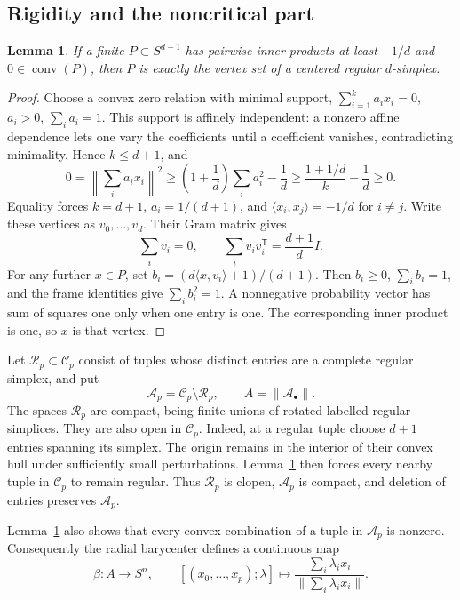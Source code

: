 \documentclass[11pt,a4paper]{article}
\newtheorem{lemma}[theorem]{Lemma}
\theoremstyle{definition}
\DeclareMathOperator{\conv}{conv}
\newcommand{\fat}[1]{\lVert #1\rVert}
\newcommand{\Cconf}{\mathcal C}
\newcommand{\Aconf}{\mathcal A}
\newcommand{\Rconf}{\mathcal R}
\begin{document}
\subsection{Rigidity and the noncritical part}
\begin{lemma}\label{lem:rigidity}
If a finite \(P\subset S^{d-1}\) has pairwise inner products at least \(-1/d\) and \(0\in\conv(P)\), then \(P\) is exactly the vertex set of a centered regular \(d\)-simplex.
\end{lemma}
\begin{proof}
Choose a convex zero relation with minimal support,
\(\sum_{i=1}^k a_i x_i=0\), \(a_i>0\), \(\sum_i a_i=1\).
This support is affinely independent: a nonzero affine dependence lets one vary the coefficients until a coefficient vanishes, contradicting minimality. Hence \(k\leq d+1\), and
\[
0=\left\|\sum_i a_i x_i\right\|^2
\geq \left(1+\frac1d\right)\sum_i a_i^2-\frac1d
\geq \frac{1+1/d}{k}-\frac1d
\geq0.
\]
Equality forces \(k=d+1\), \(a_i=1/(d+1)\), and
\(\langle x_i,x_j\rangle=-1/d\) for \(i\ne j\).
Write these vertices as \(v_0,\ldots,v_d\). Their Gram matrix gives
\[
\sum_i v_i=0,\qquad
\sum_i v_i v_i^{\mathsf T}=\frac{d+1}{d}I.
\]
For any further \(x\in P\), set
\(b_i=(d\langle x,v_i\rangle+1)/(d+1)\).
Then \(b_i\geq0\), \(\sum_i b_i=1\), and the frame identities give
\(\sum_i b_i^2=1\).
A nonnegative probability vector has sum of squares one only when one entry is one. The corresponding inner product is one, so \(x\) is that vertex.
\end{proof}

Let \(\Rconf_p\subset\Cconf_p\) consist of tuples whose distinct entries are a complete regular simplex, and put
\[
\Aconf_p=\Cconf_p\setminus\Rconf_p,\qquad A=\fat{\Aconf_\bullet}.
\]
The spaces \(\Rconf_p\) are compact, being finite unions of rotated labelled regular simplices. They are also open in \(\Cconf_p\). Indeed, at a regular tuple choose \(d+1\) entries spanning its simplex. The origin remains in the interior of their convex hull under sufficiently small perturbations. Lemma~\ref{lem:rigidity} then forces every nearby tuple in \(\Cconf_p\) to remain regular. Thus \(\Rconf_p\) is clopen, \(\Aconf_p\) is compact, and deletion of entries preserves \(\Aconf_p\).

Lemma~\ref{lem:rigidity} also shows that every convex combination of a tuple in \(\Aconf_p\) is nonzero. Consequently the radial barycenter defines a continuous map
\[
\beta:A\longrightarrow S^n,\qquad
[(x_0,\ldots,x_p);\lambda]\longmapsto
\frac{\sum_i\lambda_i x_i}{\|\sum_i\lambda_i x_i\|}.
\]
\end{document}
